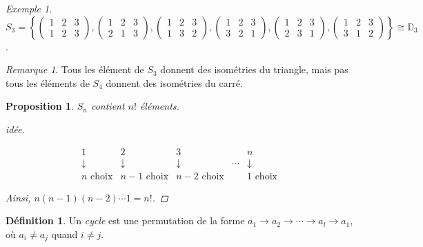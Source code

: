 \documentclass{report}
\newtheorem*{prop}{Proposition}
\theoremstyle{definition}
\newtheorem*{defin}{D\'efinition}
\theoremstyle{remark}
\newtheorem*{exem}{Exemple}
\newtheorem*{rema}{Remarque}
\begin{document}
\begin{exem}
		$S_3 = \left\lbrace \begin{pmatrix}
			1&2&3\\1&2&3
		\end{pmatrix}, \begin{pmatrix}
			1&2&3\\2&1&3
		\end{pmatrix}, \begin{pmatrix}
			1&2&3\\1&3&2
		\end{pmatrix}, \begin{pmatrix}
			1&2&3\\3&2&1
		\end{pmatrix}, \begin{pmatrix}
			1&2&3\\2&3&1
		\end{pmatrix}, \begin{pmatrix}
			1&2&3\\3&1&2
		\end{pmatrix} \right\rbrace \cong \mathbb{D}_3$.
	\end{exem}
	\begin{rema}
		Tous les \'el\'ement de $S_3$ donnent des isom\'etries du triangle, mais pas tous les \'el\'ements de $S_4$ donnent des isom\'etries du carr\'e.
	\end{rema}
	\begin{prop}
		$S_n$ contient $n!$ \'el\'ements.
		\begin{proof}[id\'ee]~

			\[
			\begin{matrix}
				1&2&3&&n\\
				\downarrow&\downarrow&\downarrow&\dotsb&\downarrow\\
				n\text{ choix}&n-1\text{ choix}&n-2\text{ choix}&&1\text{ choix}
			\end{matrix}
			\]

			Ainsi, $n(n-1)(n-2)\dotsb1 = n!$.
			\renewcommand{\qedsymbol}{\#}
		\end{proof}
		\renewcommand{\qedsymbol}{$\square$}
	\end{prop}
	\begin{defin}
		Un \emph{cycle} est une permutation de la forme $a_1 \to a_2 \to \dotsb \to a_l \to a_1$, o\`u $a_i \neq a_j$ quand $i \neq j$.
		\begin{center}
		\end{center}
	\end{defin}
\end{document}
